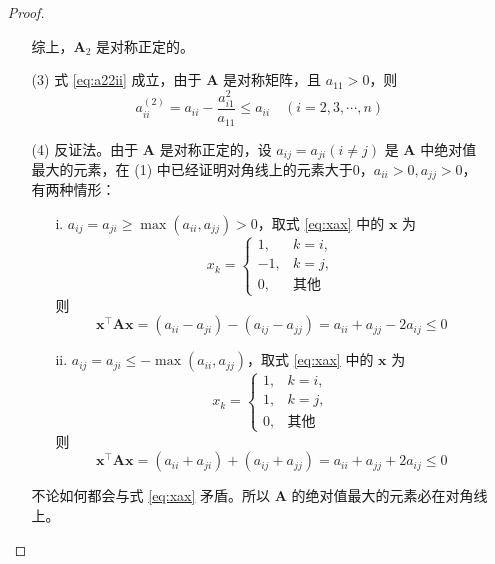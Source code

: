 \documentclass{sjtuarticle}
\begin{document}
\begin{itemize}
\begin{proof}
\begin{itemize}
            综上，$\bm{A}_2$ 是对称正定的。

            \item[(3)] 式 \eqref{eq:a22ii} 成立，由于 $\bm{A}$ 是对称矩阵，且 $a_{11}>0$，则
            \begin{equation*}
                a_{ii}^{(2)}=a_{ii}-\frac{a_{i1}^2}{a_{11}}\leq a_{ii}\quad (i=2,3,\cdots,n)
            \end{equation*}

            \item[(4)] 反证法。由于 $\bm{A}$ 是对称正定的，设 $a_{ij}=a_{ji}(i\neq j)$ 是 $\bm{A}$ 中绝对值最大的元素，在 (1) 中已经证明对角线上的元素大于0，$a_{ii}>0,a_{jj}>0$，有两种情形：
            \begin{enumerate}
                \item[i.] $a_{ij}=a_{ji}\geq\max(a_{ii},a_{jj})>0$，取式 \eqref{eq:xax} 中的 $\bm{x}$ 为
                \begin{equation*}
                    x_k=\begin{cases}
                        1, & k=i,\\
                        -1, & k=j, \\
                        0, & \text{其他}
                    \end{cases}
                \end{equation*}
                则
                \begin{equation*}
                    \bm{x}^\top\bm{A}\bm{x}=(a_{ii}-a_{ji})-(a_{ij}-a_{jj})=a_{ii}+a_{jj}-2a_{ij}\leq 0
                \end{equation*}
                \item[ii.] $a_{ij}=a_{ji}\leq-\max(a_{ii},a_{jj})$，取式 \eqref{eq:xax} 中的 $\bm{x}$ 为
                \begin{equation*}
                    x_k=\begin{cases}
                        1, & k=i,\\
                        1, & k=j, \\
                        0, & \text{其他}
                    \end{cases}
                \end{equation*}
                则
                \begin{equation*}
                    \bm{x}^\top\bm{A}\bm{x}=(a_{ii}+a_{ji})+(a_{ij}+a_{jj})=a_{ii}+a_{jj}+2a_{ij}\leq 0
                \end{equation*}
            \end{enumerate}
            不论如何都会与式 \eqref{eq:xax} 矛盾。所以 $\bm{A}$ 的绝对值最大的元素必在对角线上。


\end{itemize}
\end{proof}
\end{itemize}
\end{document}
